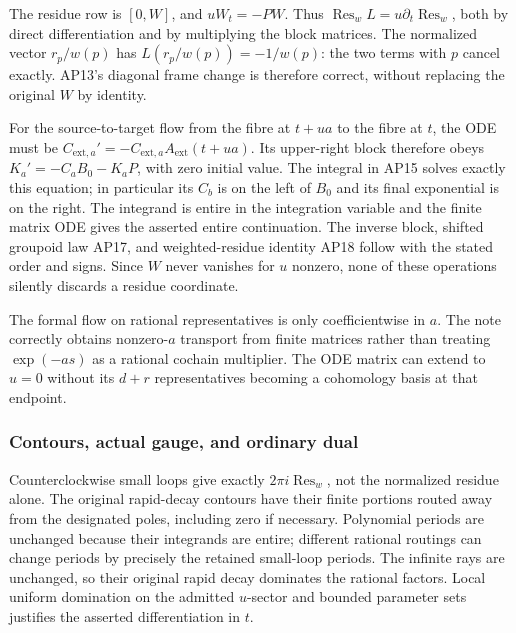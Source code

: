 \documentclass{article}
\begin{document}
The residue row is \([0,W]\), and \(u W_t=-P W\). Thus \(\operatorname{Res}_w L=u\partial_t\operatorname{Res}_w\), both by direct differentiation and by multiplying the block matrices. The normalized vector \(r_p/w(p)\) has \(L(r_p/w(p))=-1/w(p)\): the two terms with \(p\) cancel exactly. AP13's diagonal frame change is therefore correct, without replacing the original \(W\) by identity.

For the source-to-target flow from the fibre at \(t+ua\) to the fibre at \(t\), the ODE must be \(C_{\mathrm{ext},a}'=-C_{\mathrm{ext},a}A_{\mathrm{ext}}(t+ua)\). Its upper-right block therefore obeys \(K_a'=-C_a B_0-K_a P\), with zero initial value. The integral in AP15 solves exactly this equation; in particular its \(C_b\) is on the left of \(B_0\) and its final exponential is on the right. The integrand is entire in the integration variable and the finite matrix ODE gives the asserted entire continuation. The inverse block, shifted groupoid law AP17, and weighted-residue identity AP18 follow with the stated order and signs. Since \(W\) never vanishes for \(u\) nonzero, none of these operations silently discards a residue coordinate.

The formal flow on rational representatives is only coefficientwise in \(a\). The note correctly obtains nonzero-\(a\) transport from finite matrices rather than treating \(\exp(-as)\) as a rational cochain multiplier. The ODE matrix can extend to \(u=0\) without its \(d+r\) representatives becoming a cohomology basis at that endpoint.

\subsubsection{Contours, actual gauge, and ordinary dual}\label{endpoint-analytic_pole_review--contours-actual-gauge-and-ordinary-dual}

Counterclockwise small loops give exactly \(2\pi i\operatorname{Res}_w\), not the normalized residue alone. The original rapid-decay contours have their finite portions routed away from the designated poles, including zero if necessary. Polynomial periods are unchanged because their integrands are entire; different rational routings can change periods by precisely the retained small-loop periods. The infinite rays are unchanged, so their original rapid decay dominates the rational factors. Local uniform domination on the admitted \(u\)-sector and bounded parameter sets justifies the asserted differentiation in \(t\).
\end{document}
